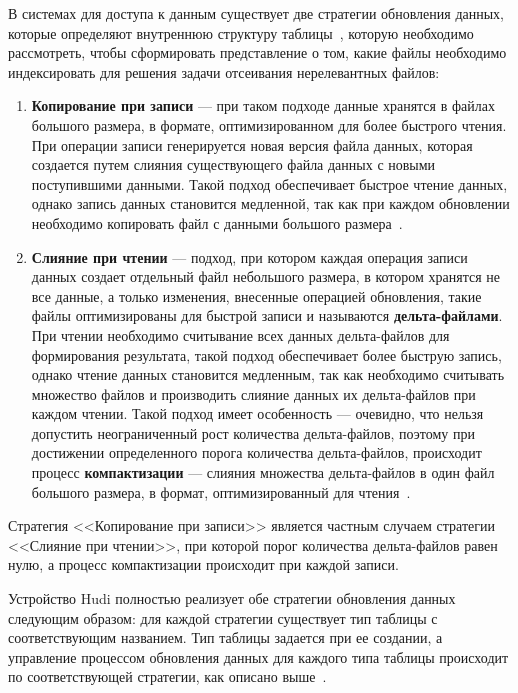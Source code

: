 В системах для доступа к данным существует две стратегии обновления данных, которые определяют внутреннюю структуру таблицы~\cite{Analyzing_and_comparing_lakehouse_storage_systems}, которую необходимо рассмотреть, чтобы сформировать представление о том, какие файлы необходимо индексировать для решения задачи отсеивания нерелевантных файлов: 
\begin{enumerate}
    \item \textbf{Копирование при записи} --- при таком подходе данные хранятся в файлах большого размера, в формате, оптимизированном для более быстрого чтения. При операции записи генерируется новая версия файла данных, которая создается путем слияния существующего файла данных с новыми поступившими данными. Такой подход обеспечивает быстрое чтение данных, однако запись данных становится медленной, так как при каждом обновлении необходимо копировать файл с данными большого размера~\cite{Analyzing_and_comparing_lakehouse_storage_systems}.
    \item \textbf{Слияние при чтении} --- подход, при котором каждая операция записи данных создает отдельный файл небольшого размера, в котором хранятся не все данные, а только изменения, внесенные операцией обновления, такие файлы оптимизированы для быстрой записи и называются \textbf{дельта-файлами}. При чтении необходимо считывание всех данных дельта-файлов для формирования результата, такой подход обеспечивает более быструю запись, однако чтение данных становится медленным, так как необходимо считывать множество файлов и производить слияние данных их дельта-файлов при каждом чтении. Такой подход имеет особенность --- очевидно, что нельзя допустить неограниченный рост количества дельта-файлов, поэтому при достижении определенного порога количества дельта-файлов, происходит процесс \textbf{компактизации} --- слияния множества дельта-файлов в один файл большого размера, в формат, оптимизированный для чтения~\cite{Analyzing_and_comparing_lakehouse_storage_systems}. 
\end{enumerate}
Стратегия {<<Копирование при записи>>} является частным случаем стратегии {<<Слияние при чтении>>}, при которой порог количества дельта-файлов равен нулю, а процесс компактизации происходит при каждой записи.

Устройство Hudi полностью реализует обе стратегии обновления данных следующим образом: для каждой стратегии существует тип таблицы с соответствующим названием. Тип таблицы задается при ее создании, а управление процессом обновления данных для каждого типа таблицы происходит по соответствующей стратегии, как описано выше~\cite{Hudi_Table_types}.

